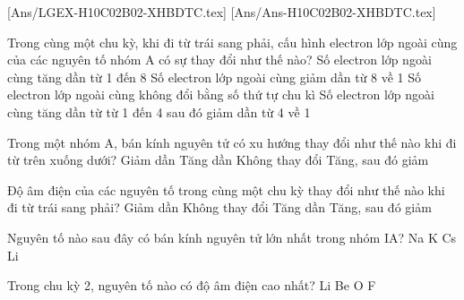 [Ans/LGEX-H10C02B02-XHBDTC.tex]
[Ans/Ans-H10C02B02-XHBDTC.tex]
\hienthiloigiaiex
{}
\begin{ex}%
	Trong cùng một chu kỳ, khi đi từ trái sang phải, cấu hình electron lớp ngoài cùng của các nguyên tố nhóm A có sự thay đổi như thế nào?
	\choice
	{\True Số electron lớp ngoài cùng tăng dần từ 1 đến 8}
	{Số electron lớp ngoài cùng giảm dần từ 8 về 1}
	{Số electron lớp ngoài cùng không đổi bằng số thứ tự chu kì}
	{Số electron lớp ngoài cùng tăng dần từ từ 1 đến 4 sau đó giảm dần từ 4 về 1}
\end{ex}
\begin{ex}%
	Trong một nhóm A, bán kính nguyên tử có xu hướng thay đổi như thế nào khi đi từ trên xuống dưới?
	\choice
	{Giảm dần}
	{\True Tăng dần}
	{Không thay đổi}
	{Tăng, sau đó giảm}
\end{ex}
\begin{ex}%
	Độ âm điện của các nguyên tố trong cùng một chu kỳ thay đổi như thế nào khi đi từ trái sang phải?
	\choice
	{Giảm dần}
	{Không thay đổi}
	{\True Tăng dần}
	{Tăng, sau đó giảm}
\end{ex}
\begin{ex}%
	Nguyên tố nào sau đây có bán kính nguyên tử lớn nhất trong nhóm IA?
	\choice
	{Na}
	{K}
	{\True Cs}
	{Li}
\end{ex}
\begin{ex}%
	Trong chu kỳ 2, nguyên tố nào có độ âm điện cao nhất?
	\choice
	{Li}
	{Be}
	{O}
	{\True F}
\end{ex}
